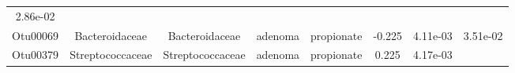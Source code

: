 \documentclass[11pt,]{article}
\begin{document}
\begin{longtable}[]{@{}cccccccc@{}}
\begin{minipage}[t]{0.08\columnwidth}
2.86e-02\strut
\end{minipage}\tabularnewline
\begin{minipage}[t]{0.08\columnwidth}\centering\strut
Otu00069\strut
\end{minipage} & \begin{minipage}[t]{0.15\columnwidth}\centering\strut
Bacteroidaceae\strut
\end{minipage} & \begin{minipage}[t]{0.15\columnwidth}\centering\strut
Bacteroidaceae\strut
\end{minipage} & \begin{minipage}[t]{0.08\columnwidth}\centering\strut
adenoma\strut
\end{minipage} & \begin{minipage}[t]{0.09\columnwidth}\centering\strut
propionate\strut
\end{minipage} & \begin{minipage}[t]{0.07\columnwidth}\centering\strut
-0.225\strut
\end{minipage} & \begin{minipage}[t]{0.08\columnwidth}\centering\strut
4.11e-03\strut
\end{minipage} & \begin{minipage}[t]{0.08\columnwidth}\centering\strut
3.51e-02\strut
\end{minipage}\tabularnewline
\begin{minipage}[t]{0.08\columnwidth}\centering\strut
Otu00379\strut
\end{minipage} & \begin{minipage}[t]{0.15\columnwidth}\centering\strut
Streptococcaceae\strut
\end{minipage} & \begin{minipage}[t]{0.15\columnwidth}\centering\strut
Streptococcaceae\strut
\end{minipage} & \begin{minipage}[t]{0.08\columnwidth}\centering\strut
adenoma\strut
\end{minipage} & \begin{minipage}[t]{0.09\columnwidth}\centering\strut
propionate\strut
\end{minipage} & \begin{minipage}[t]{0.07\columnwidth}\centering\strut
0.225\strut
\end{minipage} & \begin{minipage}[t]{0.08\columnwidth}\centering\strut
4.17e-03\strut
\end{minipage} & \begin{minipage}[t]{0.08\columnwidth}\centering\strut

\end{minipage}
\end{longtable}
\end{document}
